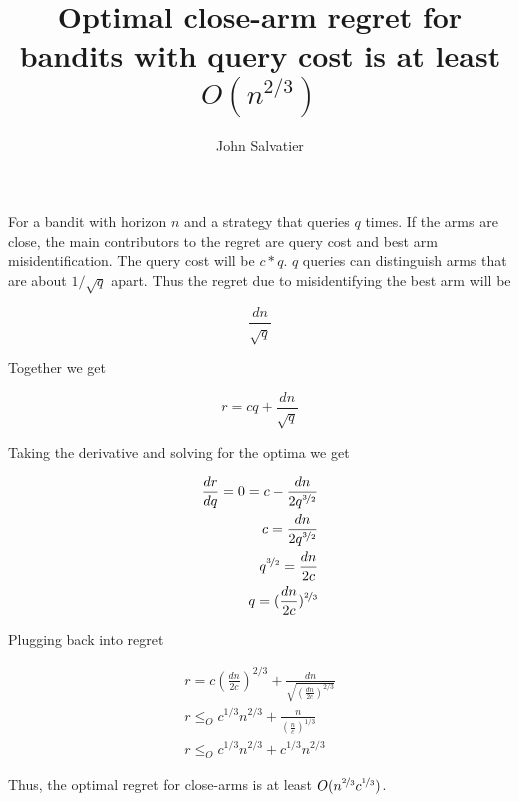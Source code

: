 \documentclass{article}
\begin{document}
\title{Optimal close-arm regret for bandits with query cost is at least $O(n^{2/3})$ }
\author{John Salvatier}
\maketitle


For a bandit with horizon $n$ and a strategy that queries $q$ times. If the arms are close, the main contributors to the regret are query cost and best arm misidentification. The query cost will be $c*q$. $q$ queries can distinguish arms that are about $1/\sqrt{q}$ apart. Thus the regret due to misidentifying the best arm will be

$$
\frac{ d n}{\sqrt{q}}
$$

Together we get 

$$
r = cq + \frac{ d n}{\sqrt{q}}
$$

Taking the derivative and solving for the optima we get 

\begin{align}
\frac{dr}{dq} = 0 = c - \frac{d n}{2 q^{\nicefrac{3}{2}} } 
\\c = \frac{d n}{2 q^{\nicefrac{3}{2}}} 
\\q^{\nicefrac{3}{2}} = \frac{d n}{2 c} 
\\q = (\frac{d n}{2 c})^{\nicefrac{2}{3} }
\end{align}

Plugging back into regret

\begin{align}
r = c (\frac{d n}{2 c})^{2/3} + \frac{d n}{\sqrt{(\frac{d n}{2 c})^{2/3}} }
\\ r \le_O c^{1/3} n^{2/3} + \frac{ n}{(\frac{n}{c})^{1/3}}
\\ r \le_O c^{1/3} n^{2/3} + c^{1/3} n^{2/3} 
\end{align}

Thus, the optimal regret for close-arms is at least $O(n^{\nicefrac{2}{3}} c^{\nicefrac{1}{3}})$. 
\end{document}
